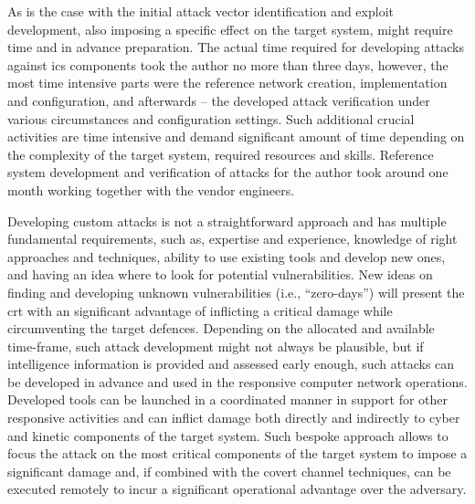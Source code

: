 As is the case with the initial attack vector identification and exploit development, also imposing a specific effect on the target system, might require time and in advance preparation.
The actual time required for developing attacks against \gls{ics} components took the author no more than three days, however, the most time intensive parts were the reference network creation, implementation and configuration, and afterwards -- the developed attack verification under various circumstances and configuration settings. Such additional crucial activities are time intensive and demand significant amount of time depending on the complexity of the target system, required resources and skills. Reference system development and verification of attacks for the author took around one month working together with the vendor engineers.

Developing custom attacks is not a straightforward approach and has multiple fundamental requirements, such as, expertise and experience, knowledge of right approaches and techniques, ability to use existing tools and develop new ones, and having an idea where to look for potential vulnerabilities. New ideas on finding and developing unknown vulnerabilities (i.e., ``zero-days'') will present the \gls{crt} with an significant advantage of inflicting a critical damage while circumventing the target defences.
Depending on the allocated and available time-frame, such attack development might not always be plausible, but if intelligence information is provided and assessed early enough, such attacks can be developed in advance and used in the responsive computer network operations. Developed tools can be launched in a coordinated manner in support for other responsive activities and can inflict damage both directly and indirectly to cyber and kinetic components of the target system.
Such bespoke approach allows to focus the attack on the most critical components of the target system to impose a significant damage and, if combined with the covert channel techniques, can be executed remotely to incur a significant operational advantage over the adversary.

